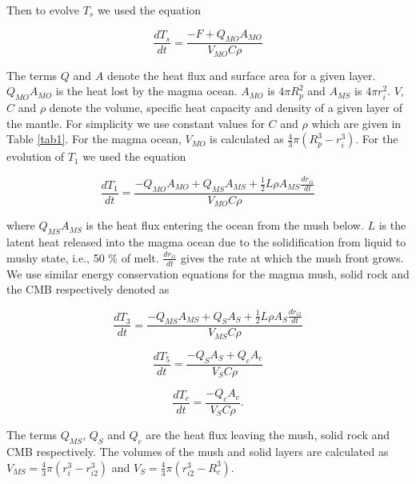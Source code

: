 \documentclass[fleqn,usenatbib]{mnras}
\begin{document}
\noindent Then to evolve $T_{s}$ we used the equation 

\begin{equation}
\label{Eqn7}
\frac{dT_{s}}{dt} = \frac{-F + Q_{MO} A_{MO}}{V_{MO} C \rho}
\end{equation}

\noindent The terms $Q$ and $A$ denote the heat flux and surface area for a given layer. $Q_{MO} A_{MO}$ is the heat lost by the magma ocean. $A_{MO}$ is $4 \pi R_{p}^{2}$ and $A_{MS}$ is $4 \pi r_{i}^{2}$. $V$, $C$ and $\rho$ denote the volume, specific heat capacity and density of a given layer of the mantle. For simplicity we use constant values for $C$ and $\rho$ which are given in Table \ref{tab1}. For the magma ocean, $V_{MO}$ is calculated as $\frac{4}{3} \pi (R_{p}^{3} - r_{i}^{3})$. For the evolution of $T_{1}$ we used the equation

\begin{equation}
\label{Eqn8}
\frac{dT_{1}}{dt} = \frac{-Q_{MO} A_{MO} + Q_{MS} A_{MS} + \frac{1}{2} L \rho A_{MS} \frac{dr_{i1}}{dt}}{V_{MO} C \rho}
\end{equation}

\noindent where $Q_{MS} A_{MS}$ is the heat flux entering the ocean from the mush below. $L$ is the latent heat released into the magma ocean due to the solidification from liquid to mushy state, i.e., 50 \% of melt. $\frac{dr_{i1}}{dt}$ gives the rate at which the mush front grows. We use similar energy conservation equations for the magma mush, solid rock and the CMB respectively denoted as 

\begin{equation}
\label{Eqn9}
\frac{dT_{3}}{dt} = \frac{-Q_{MS} A_{MS} + Q_{S} A_{S} + \frac{1}{2} L \rho A_{S} \frac{dr_{i2}}{dt}}{V_{MS} C \rho}
\end{equation}

\begin{equation}
\label{Eqn10}
\frac{dT_{5}}{dt} = \frac{-Q_{S} A_{S} + Q_{c} A_{c}}{V_{S} C \rho}
\end{equation}

\begin{equation}
\label{Eqn11}
\frac{dT_{c}}{dt} = \frac{-Q_{c} A_{c}}{V_{S} C \rho}.
\end{equation}

\noindent The terms $Q_{MS}$, $Q_{S}$ and $Q_{c}$ are the heat flux leaving the mush, solid rock and CMB respectively. The volumes of the mush and solid layers are calculated as $V_{MS} = \frac{4}{3} \pi (r_{i}^{3} - r_{i2}^{3})$ and $V_{S} = \frac{4}{3} \pi (r_{i2}^{3} - R_{c}^{3})$. 
\end{document}
